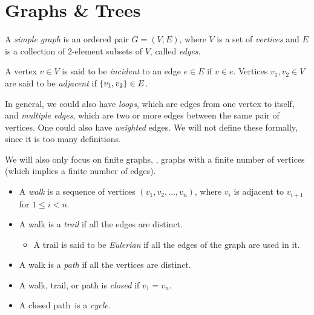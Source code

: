 \section{Graphs \& Trees} \label{sec:graphs_trees}

\begin{definition} \label{def:graph}
    A \emph{simple graph} is an ordered pair $G = (V, E)$, where $V$ is a
    set of \emph{vertices} and $E$ is a collection of $2$-element subsets of
    $V$, called \emph{edges}.

    A vertex $v \in V$ is said to be \emph{incident} to an edge $e \in E$ if
    $v \in e$.
    Vertices $v_1, v_2 \in V$ are said to be \emph{adjacent} if
    $\set{v_1, v_2} \in E$.
\end{definition}
In general, we could also have \emph{loops}, which are edges from one vertex
to itself, and \emph{multiple edges}, which are two or more edges between
the same pair of vertices.
One could also have \emph{weighted} edges.
We will not define these formally, since it is too many definitions.

We will also only focus on finite graphs, \ie, graphs with a finite number
of vertices (which implies a finite number of edges).

\begin{definition} \label{def:graph:walk}
    \leavevmode
    \begin{itemize}
        \item A \emph{walk} is a sequence of vertices
        $(v_1, v_2, \dots, v_n)$, where $v_i$ is adjacent to $v_{i+1}$ for
        $1 \leq i < n$.
        \item A walk is a \emph{trail} if all the edges are distinct.
        \begin{itemize}
            \item A trail is said to be \emph{Eulerian} if all the edges of
            the graph are used in it.
        \end{itemize}
        \item A walk is a \emph{path} if all the vertices are distinct.
        \item A walk, trail, or path is \emph{closed} if $v_1 = v_n$.
        \item A closed path\footnotemark\ is a \emph{cycle}.
    \end{itemize}
\end{definition}

